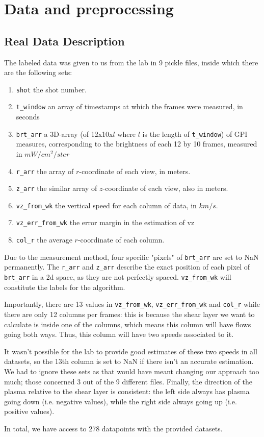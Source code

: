 \documentclass[10pt,conference]{IEEEtran}
\begin{document}
\section{Data and preprocessing}

\subsection{Real Data Description}
The labeled data was given to us from the lab in 9 pickle files, inside which there are the following sets:
\begin{enumerate}
  \item \texttt{shot} the shot number.
  \item \texttt{t\_window} an array of timestamps at which the frames were measured, in seconds
  \item \texttt{brt\_arr} a 3D-array (of 12x10x$l$ where $l$ is the length of \texttt{t\_window}) of GPI measures, corresponding to the brightness of each 12 by 10 frames, measured in $mW/cm^2/ster$
  \item \texttt{r\_arr} the array of $r$-coordinate of each view, in meters.
  \item \texttt{z\_arr} the similar array of $z$-coordinate of each view, also in meters.
  \item \texttt{vz\_from\_wk} the vertical speed for each column of data, in $km/s$.
  \item \texttt{vz\_err\_from\_wk} the error margin in the estimation of vz
  \item \texttt{col\_r} the average $r$-coordinate of each column.
\end{enumerate}
Due to the measurement method, four specific "pixels" of \texttt{brt\_arr} are set to NaN permanently. The \texttt{r\_arr} and \texttt{z\_arr} describe the exact position of each pixel of \texttt{brt\_arr} in a 2d space, as they are not perfectly spaced. \texttt{vz\_from\_wk} will constitute the labels for the algorithm.\par
Importantly, there are 13 values in \texttt{vz\_from\_wk}, \texttt{vz\_err\_from\_wk} and \texttt{col\_r} while there are only 12 columns per frames: this is because the shear layer we want to calculate is inside one of the columns, which means this column will have flows going both ways. Thus, this column will have two speeds associated to it. \par
It wasn't possible for the lab to provide good estimates of these two speeds in all datasets, so the 13th column is set to NaN if there isn't an accurate estimation. We had to ignore these sets as that would have meant changing our approach too much; those concerned 3 out of the 9 different files.
Finally, the direction of the plasma relative to the shear layer is consistent: the left side always has plasma going down (i.e. negative values), while the right side always going up (i.e. positive values). \par
In total, we have access to 278 datapoints with the provided datasets.
\end{document}
